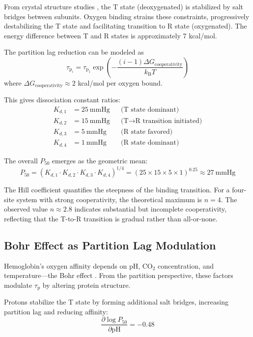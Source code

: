 \documentclass[12pt,a4paper]{article}
\theoremstyle{remark}
\newcommand{\kB}{k_{\mathrm{B}}}
\newcommand{\taulag}{\tau_{\mathrm{p}}}
\begin{document}
From crystal structure studies \cite{perutz1970stereochemistry}, the T state (deoxygenated) is stabilized by salt bridges between subunits. Oxygen binding strains these constraints, progressively destabilizing the T state and facilitating transition to R state (oxygenated). The energy difference between T and R states is approximately 7 kcal/mol.

The partition lag reduction can be modeled as
\begin{equation}
\taulag_{i} = \taulag_{1} \exp\left(-\frac{(i-1) \Delta G_{\mathrm{cooperativity}}}{\kB T}\right)
\end{equation}
where $\Delta G_{\mathrm{cooperativity}} \approx 2$ kcal/mol per oxygen bound.

This gives dissociation constant ratios:
\begin{align}
K_{d,1} &= 25~\mathrm{mmHg} &&\text{(T state dominant)} \\
K_{d,2} &= 15~\mathrm{mmHg} &&\text{(T} \to \text{R transition initiated)} \\
K_{d,3} &= 5~\mathrm{mmHg} &&\text{(R state favored)} \\
K_{d,4} &= 1~\mathrm{mmHg} &&\text{(R state dominant)}
\end{align}

The overall $P_{50}$ emerges as the geometric mean:
\begin{equation}
P_{50} = (K_{d,1} \cdot K_{d,2} \cdot K_{d,3} \cdot K_{d,4})^{1/4} = (25 \times 15 \times 5 \times 1)^{0.25} \approx 27~\mathrm{mmHg}
\end{equation}

The Hill coefficient quantifies the steepness of the binding transition. For a four-site system with strong cooperativity, the theoretical maximum is $n = 4$. The observed value $n \approx 2.8$ indicates substantial but incomplete cooperativity, reflecting that the T-to-R transition is gradual rather than all-or-none.

\subsection{Bohr Effect as Partition Lag Modulation}

Hemoglobin's oxygen affinity depends on pH, CO$_{2}$ concentration, and temperature—the Bohr effect \cite{bohr1904haemoglobin}. From the partition perspective, these factors modulate $\taulag$ by altering protein structure.

Protons stabilize the T state by forming additional salt bridges, increasing partition lag and reducing affinity:
\begin{equation}
\frac{\partial \log P_{50}}{\partial \mathrm{pH}} = -0.48
\end{equation}
\end{document}
